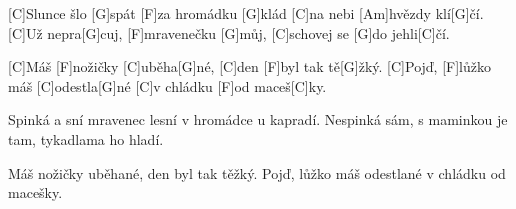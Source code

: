 
[C]Slunce šlo [G]spát 
[F]za hromádku [G]klád
[C]na nebi [Am]hvězdy klí[G]\null čí.
[C]Už nepra[G]cuj, [F]mravenečku [G]můj,
[C]schovej se [G]do jehli[C]\null čí.


[C]Máš [F]nožičky [C]uběha[G]né,
[C]den [F]byl tak tě[G]\null žký.
[C]Pojď, [F]lůžko máš [C]odestla[G]né
[C]v chládku [F]od maceš[C]ky.

\slpc

Spinká a sní
mravenec lesní
v hromádce u kapradí.
Nespinká sám,
s maminkou je tam,
tykadlama ho hladí.

Máš nožičky uběhané,
den byl tak těžký.
Pojď, lůžko máš odestlané
v chládku od macešky.